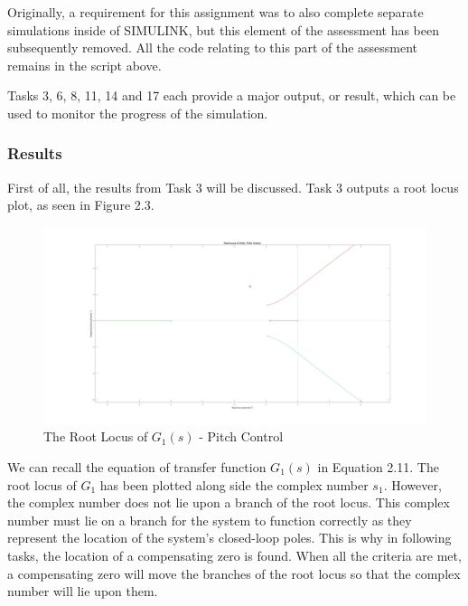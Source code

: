 \documentclass[stu, a4paper, 12pt, floatsintext]{apa7}
\numberwithin{figure}{section}
\numberwithin{table}{section}
\numberwithin{equation}{section}
\begin{document}
Originally, a requirement for this assignment was to also complete separate simulations inside of SIMULINK, but this element of the assessment has been subsequently removed. All the code relating to this part of the assessment remains in the script above. 

Tasks 3, 6, 8, 11, 14 and 17 each provide a major output, or result, which can be used to monitor the progress of the simulation.
\subsubsection{Results}
First of all, the results from Task 3 will be discussed. Task 3 outputs a root locus plot, as seen in Figure 2.3.
\begin{figure}[H]
    \caption{The Root Locus of $G_1(s)$ - Pitch Control}
    \label{fig:task3_result}
    \centering
    \includegraphics[width=1.0\textwidth]{pictures/Auotpilot/Task3.jpg}
\end{figure}

We can recall the equation of transfer function $G_1(s)$ in Equation 2.11. The root locus of $G_1$ has been plotted along side the complex number $s_1$. However, the complex number does not lie upon a branch of the root locus. This complex number must lie on a branch for the system to function correctly as they represent the location of the system's closed-loop poles. This is why in following tasks, the location of a compensating zero is found. When all the criteria are met, a compensating zero will move the branches of the root locus so that the complex number will lie upon them. 
\end{document}

